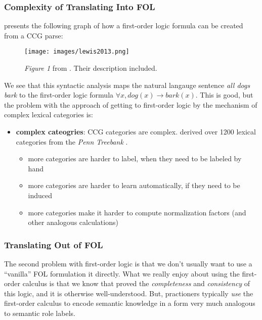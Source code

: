 \documentclass[12pt]{article}
\begin{document}
\subsubsection{Complexity of Translating Into FOL}
\cite{lewis2013combined} presents the following graph of how a first-order logic formula can be created from a CCG parse:
\begin{figure}[h]
    \centering
    \texttt{[image: images/lewis2013.png]}
    \caption{{\em Figure 1} from \cite{lewis2013combined}. Their description included.}
    \label{fig:lewis2013}
\end{figure}
We see that this syntactic analysis maps the natural langauge sentence {\em all dogs bark} to the first-order logic formula $\forall x, dog(x) \rightarrow bark(x)$.
This is good, but the problem with the approach of getting to first-order logic by the mechanism of complex lexical categories is:
\begin{itemize}
    \item {\bf complex cateogries}: CCG categories are complex. \cite{hockenmaier2007ccgbank} derived over 1200 lexical categories from the {\em Penn Treebank} \cite{Marcus1993}.
        \begin{itemize}
            \item more categories are harder to label, when they need to be labeled by hand
            \item more categories are harder to learn automatically, if they need to be induced
            \item more categories make it harder to compute normalization factors (and other analogous calculations)
        \end{itemize}
\end{itemize}

\subsubsection{Translating Out of FOL}
The second problem with first-order logic is that we don't usually want to use a ``vanilla'' FOL formulation it directly.
What we really enjoy about using the first-order calculus is that we know that \cite{Godel1931} proved the {\em completeness} and {\em consistency} of this logic, and it is otherwise well-understood.
But, practioners typically {\em use} the first-order calculus to encode semantic knowledge in a form very much analogous to semantic role labels.
\end{document}
